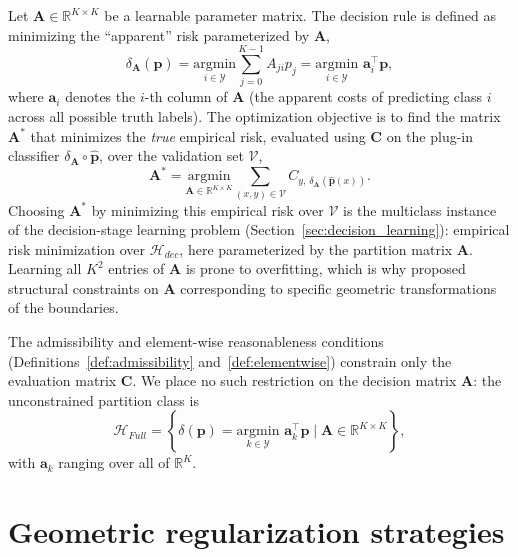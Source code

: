 Let $\mathbf{A} \in \mathbb{R}^{K \times K}$ be a learnable parameter matrix. The decision rule is defined as minimizing the ``apparent'' risk parameterized by $\mathbf{A}$,
\begin{equation}\label{eq:obrien_rule}
    \delta_{\mathbf{A}}(\mathbf{p}) = \underset{i \in \mathcal{Y}}{\mathrm{argmin}} \sum_{j=0}^{K-1} A_{ji} p_j = \underset{i \in \mathcal{Y}}{\mathrm{argmin}} \,\, \mathbf{a}_i^\top \mathbf{p},
\end{equation}
where $\mathbf{a}_i$ denotes the $i$-th column of $\mathbf{A}$ (the apparent costs of predicting class $i$ across all possible truth labels).
The optimization objective is to find the matrix $\mathbf{A}^*$ that minimizes the \textit{true} empirical risk, evaluated using $\mathbf{C}$ on the plug-in classifier $\delta_{\mathbf{A}} \circ \hat{\mathbf{p}}$, over the validation set $\mathcal{V}$,
\begin{equation}
    \mathbf{A}^* = \underset{\mathbf{A} \in \mathbb{R}^{K \times K}}{\mathrm{argmin}} \sum_{(x, y) \in \mathcal{V}} C_{y, \,\delta_{\mathbf{A}}(\hat{\mathbf{p}}(x))}.
\end{equation}
Choosing $\mathbf{A}^*$ by minimizing this empirical risk over $\mathcal{V}$ is the multiclass instance of the decision-stage learning problem (Section~\ref{sec:decision_learning}): empirical risk minimization over $\mathcal{H}_{dec}$, here parameterized by the partition matrix $\mathbf{A}$.
Learning all $K^2$ entries of $\mathbf{A}$ is prone to overfitting, which is why \citet{obrien2008costsensitive} proposed structural constraints on $\mathbf{A}$ corresponding to specific geometric transformations of the boundaries.

The admissibility and element-wise reasonableness conditions (Definitions~\ref{def:admissibility} and~\ref{def:elementwise}) constrain only the evaluation matrix $\mathbf{C}$. We place no such restriction on the decision matrix $\mathbf{A}$: the unconstrained partition class is
\begin{equation}\label{eq:hfull_def}
    \mathcal{H}_{Full} = \left\{ \delta(\mathbf{p}) = \underset{k \in \mathcal{Y}}{\mathrm{argmin}} \,\, \mathbf{a}_k^\top \mathbf{p} \mid \mathbf{A} \in \mathbb{R}^{K \times K} \right\},
\end{equation}
with $\mathbf{a}_k$ ranging over all of $\mathbb{R}^{K}$.

\section{Geometric regularization strategies}

